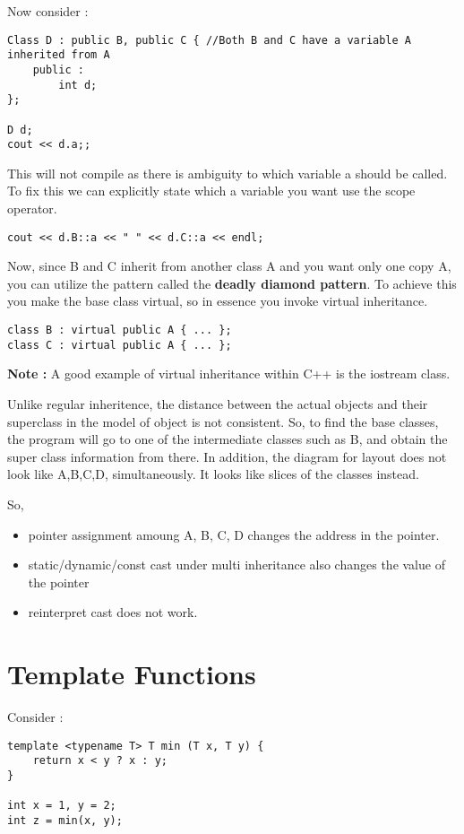 \documentclass{article}
\begin{document}
Now consider : 
\begin{lstlisting}
Class D : public B, public C { //Both B and C have a variable A inherited from A
	public :
		int d;
};

D d;
cout << d.a;;
\end{lstlisting}

This will not compile as there is ambiguity to which variable a should be called. To fix this we can explicitly state which a variable you want use the scope operator.
\begin{lstlisting}
cout << d.B::a << " " << d.C::a << endl; 
\end{lstlisting}

Now, since B and C inherit from another class A and you want only one copy A, you can utilize the pattern called the \textbf{deadly diamond pattern}. To achieve this you make the base class virtual, so in essence you invoke virtual inheritance. 

\begin{lstlisting}
class B : virtual public A { ... };
class C : virtual public A { ... };
\end{lstlisting}

\textbf{Note : } A good example of virtual inheritance within C++ is the iostream class. 

Unlike regular inheritence, the distance between the actual objects and their superclass in the model of object is not consistent. So, to find the base classes, the program will go to one of the  intermediate classes such as B, and obtain the super class information from there.  In addition, the diagram for layout does not look like A,B,C,D, simultaneously. It looks like slices of the classes instead.  

So, 

\begin{itemize}
\item pointer assignment amoung A, B, C, D changes the address in the pointer.
\item static/dynamic/const cast under multi inheritance also changes the value of the pointer 
\item reinterpret cast does not work. 
\end{itemize}

\section{Template Functions}
Consider :
\begin{lstlisting}
template <typename T> T min (T x, T y) {
	return x < y ? x : y;
}

int x = 1, y = 2;
int z = min(x, y);
\end{lstlisting}
\end{document}
